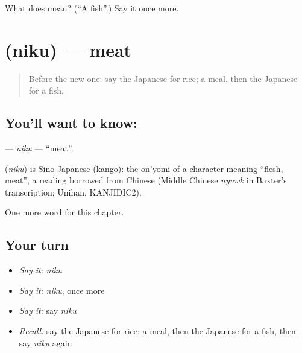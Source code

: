 \begin{tcolorbox}[breakable,colback=teal!4,colframe=teal!35!black,title={Before you move on}]
What does  mean? (\textquotedblleft{}A fish\textquotedblright{}.) Say it once more.
\end{tcolorbox}
\section[\texorpdfstring{\ja{にく} (niku)}{にく (niku)}]{ (niku) — meat}

\label{lesson:JA-C32-niku}



\begin{quote}
Before the new one: say the Japanese for rice; a meal, then the Japanese for a fish.
\end{quote}

\subsection*{You'll want to know: }
\textbf{} — \emph{niku} — \textquotedblleft{}meat\textquotedblright{}.

\begin{cousinweb}
\textbf{} (\emph{niku}) is Sino-Japanese (kango): the on'yomi of a character meaning \textquotedblleft{}flesh, meat\textquotedblright{}, a reading borrowed from Chinese (Middle Chinese \emph{nyuwk} in Baxter's transcription; Unihan, KANJIDIC2).
\end{cousinweb}

\begin{grammarlens}[title={What you've built}]
One more word for this chapter.
\end{grammarlens}

\subsection*{Your turn}
\begin{itemize}
\raggedright
  \item \emph{Say it:} \emph{niku}
  \item \emph{Say it:} \emph{niku}, once more
  \item \emph{Say it:} say \emph{niku}
  \item \emph{Recall:} say the Japanese for rice; a meal, then the Japanese for a fish, then say \emph{niku} again
\end{itemize}

